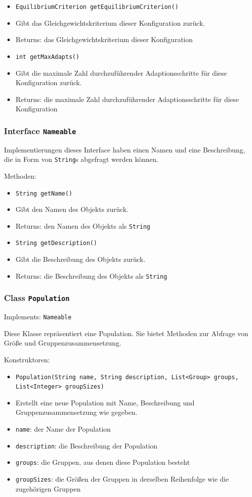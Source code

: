 \documentclass[parskip=full,11pt]{scrartcl}
\begin{document}
\begin{itemize}
\item \texttt{EquilibriumCriterion getEquilibriumCriterion()}
\item[] Gibt das Gleichgewichtskriterium dieser Konfiguration zurück.
\item[] Returns: das Gleichgewichtskriterium dieser Konfiguration

\item \texttt{int getMaxAdapts()}
\item[] Gibt die maximale Zahl durchzuführender Adaptionsschritte für diese Konfiguration zurück.
\item[] Returns: die maximale Zahl durchzuführender Adaptionsschritte für diese Konfiguration
\end{itemize}

\subsubsection{Interface \texttt{Nameable}}

Implementierungen dieses Interface haben einen Namen und eine Beschreibung, die in Form von \texttt{String}s abgefragt werden können.

Methoden:
\begin{itemize}\itemsep -10pt
\item \texttt{String getName()}
\item[] Gibt den Namen des Objekts zurück.
\item[] Returns: den Namen des Objekts als \texttt{String}

\item \texttt{String getDescription()}
\item[] Gibt die Beschreibung des Objekts zurück.
\item[] Returns: die Beschreibung des Objekts als \texttt{String}
\end{itemize}

\subsubsection{Class \texttt{Population}}
Implements: \texttt{Nameable}

Diese Klasse repräsentiert eine Population. Sie bietet Methoden zur Abfrage von Größe und Gruppenzusammensetzung.

Konstruktoren:
\begin{itemize}\itemsep -10pt
\item \texttt{Population(String name, String description, List<Group> groups, List<Integer> groupSizes)}
\item[] Erstellt eine neue Population mit Name, Beschreibung und Gruppenzusammensetzung wie gegeben.
\item[] \texttt{name}: der Name der Population
\item[] \texttt{description}: die Beschreibung der Population
\item[] \texttt{groups}: die Gruppen, aus denen diese Population besteht
\item[] \texttt{groupSizes}: die Größen der Gruppen in derselben Reihenfolge wie die zugehörigen Gruppen
\end{itemize}
\end{document}
